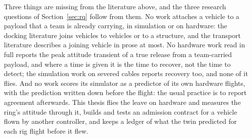 Three things are missing from the literature above, and the three research questions of Section~\ref{sec:rq}
follow from them. No work attaches a vehicle to a payload that a team is already carrying, in simulation or on
hardware: the docking literature joins vehicles to vehicles or to a structure, and the transport literature
describes a joining vehicle in prose at most. No hardware work read in full reports the peak attitude transient of
a true release from a team-carried payload, and where a time is given it is the time to recover, not the time to
detect; the simulation work on severed cables reports recovery too, and none of it flies. And no work scores its
simulator as a predictor of its own hardware flights, with the prediction written down before the flight: the
usual practice is to report agreement afterwards. This thesis flies the leave on hardware and measures the ring's
attitude through it, builds and tests an admission contract for a vehicle flown by another controller, and keeps a
ledger of what the twin predicted for each rig flight before it flew.
